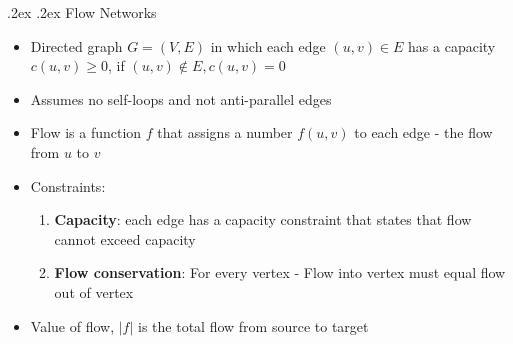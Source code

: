 \documentclass[10pt,landscape,a4paper]{article}
\makeatletter
\renewcommand{\subsection}{\@startsection{subsection}{1}{0mm}%
    {.2ex}%
    {.2ex}%
    {\sffamily\bfseries}}
\makeatother
\begin{document}
\begin{multicols*}{4}
	\subsection{Flow Networks}
	\begin{itemize}
		\item Directed graph $G=(V,E)$ in which each edge $(u,v)\in E$ has a capacity $c(u,v)\geq 0$, if $(u,v)\notin E, c(u,v)=0$
		\item Assumes no self-loops and not anti-parallel edges
		\item Flow is a function $f$ that assigns a number $f(u,v)$ to each edge - the flow from $u$ to $v$
		\item Constraints:
		      \begin{enumerate}
			      \item \textbf{Capacity}: each edge has a capacity constraint that states that flow cannot exceed capacity
			      \item \textbf{Flow conservation}: For every vertex - Flow into vertex must equal flow out of vertex
		      \end{enumerate}
		\item Value of flow, $|f|$ is the total flow from source to target
	\end{itemize}

\end{multicols*}
\end{document}
